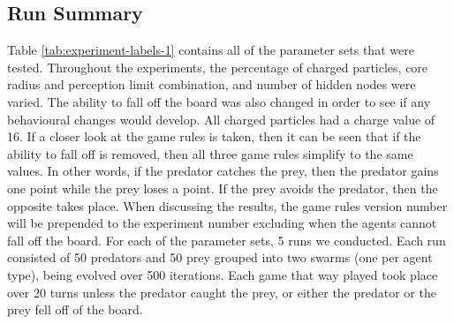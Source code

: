 \subsection{Run Summary}
Table \ref{tab:experiment-labels-1} contains all of the parameter sets that were tested. Throughout the experiments, the percentage of charged particles, core radius and perception limit combination, and number of hidden nodes were varied. The ability to fall off the board was also changed in order to see if any behavioural changes would develop. All charged particles had a charge value of 16. If a closer look at the game rules is taken, then it can be seen that if the ability to fall off is removed, then all three game rules simplify to the same values. In other words, if the predator catches the prey, then the predator gains one point while the prey loses a point. If the prey avoids the predator, then the opposite takes place. When discussing the results, the game rules version number will be prepended to the experiment number excluding when the agents cannot fall off the board. For each of the parameter sets, 5 runs we conducted. Each run consisted of 50 predators and 50 prey grouped into two swarms (one per agent type), being evolved over 500 iterations. Each game that way played took place over 20 turns unless the predator caught the prey, or either the predator or the prey fell off of the board.

